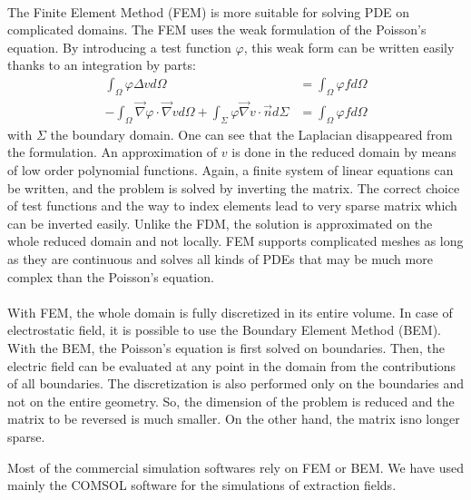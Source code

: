 \begin{refsection}
  \paragraph{}
  The Finite Element Method (FEM) is more suitable for solving PDE on complicated domains. The FEM uses the weak formulation of the Poisson’s equation. By introducing a test function $\varphi$, this weak form can be written easily thanks to an integration by parts:
  \begin{align}
    \int_{\Omega}^{} \varphi \Delta v d\Omega                                                                                           & = \int_{\Omega}^{} \varphi f d\Omega \\
    -\int_{\Omega}^{} \vec{\nabla} \varphi \cdot \vec{\nabla} v d\Omega + \int_{\Sigma}^{} \varphi \vec{\nabla} v \cdot \vec{n} d\Sigma & = \int_{\Omega}^{} \varphi f d\Omega
  \end{align}
  with $\Sigma$ the boundary domain.
  One can see that the Laplacian disappeared from the formulation. An approximation of $v$ is done in the reduced domain by means of low order polynomial functions. Again, a finite system of linear equations can be written, and the problem is solved by inverting the matrix. The correct choice of test functions and the way to index elements lead to very sparse matrix which can be inverted easily. Unlike the FDM, the solution is approximated on the whole reduced domain and not locally. FEM supports complicated meshes as long as they are continuous and solves all kinds of PDEs that may be much more complex than the Poisson’s equation.

  \paragraph{}
  With FEM, the whole domain is fully discretized in its entire volume. In case of electrostatic field, it is possible to use the Boundary Element Method (BEM). With the BEM, the Poisson’s equation is first solved on boundaries. Then, the electric field can be evaluated at any point in the domain from the contributions of all boundaries. The discretization is also performed only on the boundaries and not on the entire geometry. So, the dimension of the problem is reduced and the matrix to be reversed is much smaller. On the other hand, the matrix is ​​no longer sparse.

  Most of the commercial simulation softwares \cite{cststudio2018,ansys2018,couloumb2018} rely on FEM or BEM. We have used mainly the COMSOL software for the simulations of extraction fields.


\end{refsection}
